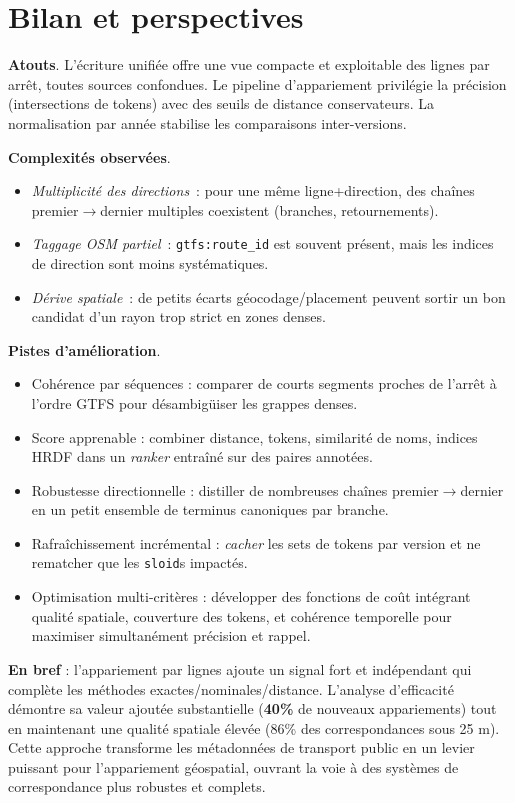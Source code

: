 \section{Bilan et perspectives}
\textbf{Atouts}. L'écriture unifiée offre une vue compacte et exploitable des lignes par arrêt, toutes sources confondues. Le pipeline d'appariement privilégie la précision (intersections de tokens) avec des seuils de distance conservateurs. La normalisation par année stabilise les comparaisons inter-versions.

\textbf{Complexités observées}.
\begin{itemize}
  \item \emph{Multiplicité des directions} : pour une même ligne+direction, des chaînes premier$\rightarrow$dernier multiples coexistent (branches, retournements).
  \item \emph{Taggage OSM partiel} : \texttt{gtfs:route\_id} est souvent présent, mais les indices de direction sont moins systématiques.
  \item \emph{Dérive spatiale} : de petits écarts géocodage/placement peuvent sortir un bon candidat d'un rayon trop strict en zones denses.
\end{itemize}

\textbf{Pistes d'amélioration}.
\begin{itemize}
  \item Cohérence par séquences : comparer de courts segments proches de l'arrêt à l'ordre GTFS pour désambigüiser les grappes denses.
  \item Score apprenable : combiner distance, tokens, similarité de noms, indices HRDF dans un \emph{ranker} entraîné sur des paires annotées.
  \item Robustesse directionnelle : distiller de nombreuses chaînes premier$\rightarrow$dernier en un petit ensemble de terminus canoniques par branche.
  \item Rafraîchissement incrémental : \emph{cacher} les sets de tokens par version et ne rematcher que les \texttt{sloid}s impactés.
  \item Optimisation multi-critères : développer des fonctions de coût intégrant qualité spatiale, couverture des tokens, et cohérence temporelle pour maximiser simultanément précision et rappel.
\end{itemize}

\noindent \textbf{En bref} : l'appariement par lignes ajoute un signal fort et indépendant qui complète les méthodes exactes/nominales/distance. L'analyse d'efficacité démontre sa valeur ajoutée substantielle (\textbf{40\%} de nouveaux appariements) tout en maintenant une qualité spatiale élevée (86\% des correspondances sous 25 m). Cette approche transforme les métadonnées de transport public en un levier puissant pour l'appariement géospatial, ouvrant la voie à des systèmes de correspondance plus robustes et complets.
